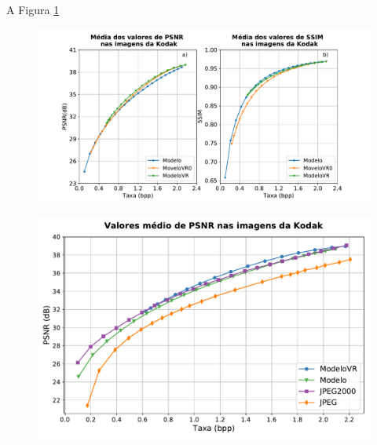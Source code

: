 A Figura \ref{fig:comp_vr}

\begin{figure}
	\centering
	\includegraphics[width=1.0\textwidth]{figuras/com_vr.pdf}
	\caption{}  	
	\label{fig:comp_vr}
\end{figure}

\begin{figure}
	\centering
	\includegraphics[width=1.0\textwidth]{figuras/comp_codecs.pdf}
	\caption{}  	
	\label{fig:comp_codecs}
\end{figure}
